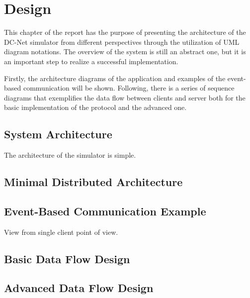 \chapter{Design}
This chapter of the report has the purpose of presenting the architecture of the DC-Net simulator from different perspectives through the utilization of UML diagram notations. The overview of the system is still an abstract one, but it is an important step to realize a successful implementation. 

Firstly, the architecture diagrams of the application and examples of the event-based communication will be shown. Following, there is a series of sequence diagrams that exemplifies the data flow between clients and server both for the basic implementation of the protocol and the advanced one.


\section{System Architecture}
The architecture of the simulator is simple.  


\section{Minimal Distributed Architecture}



\section{Event-Based Communication Example}
View from single client point of view.



\section{Basic Data Flow Design}


\section{Advanced Data Flow Design}



